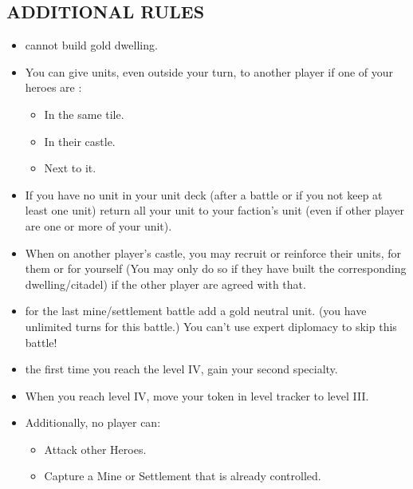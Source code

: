 \begin{multicols*}{2}
\subsection*{\MakeUppercase{Additional Rules}}
\begin{itemize}
    \item cannot build gold dwelling.
    \item You can give units, even outside your turn, to another player if one of your heroes are :
    \begin{itemize}
        \item In the same tile. 
        \item In their castle.
        \item Next to it.
    \end{itemize}
    \item If you have no unit in your unit deck (after a battle or if you not keep at least one unit) return all your unit to your faction's unit (even if other player are one or more of your unit).
    \item When on another player's castle, you may recruit or reinforce their units, for them or for yourself (You may only do so if they have built the corresponding dwelling/citadel) if the other player are agreed with that.
    \item for the last mine/settlement battle add a gold neutral unit. (you have unlimited turns for this battle.) You can't use expert diplomacy to skip this battle!
    \item the first time you reach the level IV, gain your second specialty.
    \item When you reach level IV, move your token in level tracker to level III.
    \item Additionally, no player can:
    \begin{itemize}
        \item Attack other Heroes.
        \item Capture a Mine or Settlement that is already controlled.
    \end{itemize}
\end{itemize}

\end{multicols*}

\newpage

